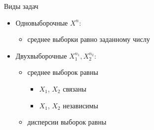 \documentclass[11pt,pdf,utf8,hyperref={unicode},aspectratio=169]{beamer}
\begin{document}
\begin{frame}[label=classification]{Виды задач}
    \begin{itemize}
    \item Одновыборочные $X^n$:
    \begin{itemize}
        \item среднее выборки равно заданному числу \hyperlink{signtest1}{} \hyperlink{signrank1}{} \hyperlink{perm1s}{}
     \end{itemize}

     \bigskip

    \item Двухвыборочные {$X_1^{n_1}, X_2^{n_2}$}:
    \begin{itemize}
        \item среднее выборок равны
         \begin{itemize}
            \item $X_1$, $X_2$ связаны
            \hyperlink{signtest2}{} \hyperlink{signrank2}{}
            \item $X_1$, $X_2$ независимы
             \hyperlink{mannwhitney}{} \hyperlink{perm2sn}{}
         \end{itemize}
        \item дисперсии выборок равны
            \hyperlink{siegel}{}
            \hyperlink{perm2d}{}
    \end{itemize}
    \end{itemize}
\end{frame}
\end{document}
